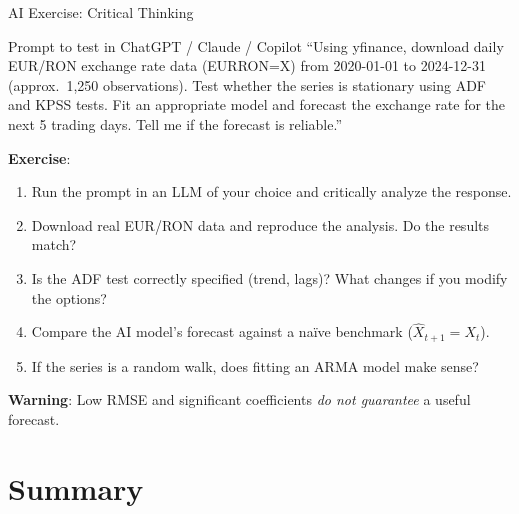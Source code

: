 \documentclass[9pt, aspectratio=169, t]{beamer}
\begin{document}
\begin{frame}{AI Exercise: Critical Thinking}
    \vspace{-2mm}
    \begin{block}{\footnotesize Prompt to test in ChatGPT / Claude / Copilot}
        {\small
        ``Using yfinance, download daily EUR/RON exchange rate data (EURRON=X) from 2020-01-01 to 2024-12-31 (approx.\ 1{,}250 observations). Test whether the series is stationary using ADF and KPSS tests. Fit an appropriate model and forecast the exchange rate for the next 5 trading days. Tell me if the forecast is reliable.''
        }
    \end{block}
    \vspace{-1mm}
    {\small
    \textbf{Exercise}:
    \begin{enumerate}\setlength{\itemsep}{2pt}
        \item Run the prompt in an LLM of your choice and critically analyze the response.
        \item Download real EUR/RON data and reproduce the analysis. Do the results match?
        \item Is the ADF test correctly specified (trend, lags)? What changes if you modify the options?
        \item Compare the AI model's forecast against a na\"ive benchmark ($\hat{X}_{t+1} = X_t$).
        \item If the series is a random walk, does fitting an ARMA model make sense?
    \end{enumerate}
    }
    \vspace{-1mm}
    \begin{alertblock}{}
        {\small \textbf{Warning}: Low RMSE and significant coefficients \textit{do not guarantee} a useful forecast.}
    \end{alertblock}
\end{frame}

\section{Summary}
\end{document}
